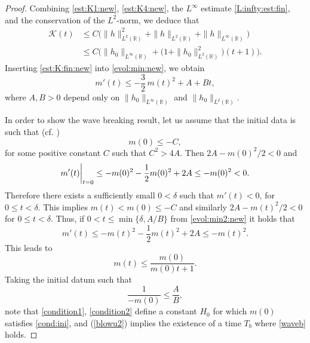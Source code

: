 \documentclass[final,11pt,a4paper,reqno]{amsart}
\newcommand{\RR}{\mathbb R}
\theoremstyle{definition}
\begin{document}
\begin{proof}
Combining \eqref{est:K1:new}, \eqref{est:K4:new}, the \(L^\infty\) estimate \eqref{L:infty:est:fin}, and the conservation of the \(L^2\)-norm, we deduce that
\begin{align}
\mathcal K(t)
&\le
C\Big(\|h\|_{L^2(\RR)}^2+\|h\|_{L^2(\RR)}+\|h\|_{L^\infty(\RR)}\Big) \nonumber\\
&\le
C\Big(\|h_0\|_{L^\infty(\RR)}+\big(1+\|h_0\|_{L^2(\RR)}^2\big)(t+1)\Big).
\label{est:K:fin:new}
\end{align}
Inserting \eqref{est:K:fin:new} into \eqref{evol:min:new}, we obtain
\begin{equation}\label{evol:min2:new}
m'(t)\le -\frac32\,m(t)^2+A+Bt,
\end{equation}
where \(A,B>0\) depend only on \(\|h_0\|_{L^\infty(\RR)}\) and \(\|h_0\|_{L^2(\RR)}\). \medskip




In order to show the wave breaking result, let us assume that the initial data is such that (cf. \cite{LeiRic})
\begin{equation}\label{condition1}
m(0)\leq -C,
\end{equation}
for some positive constant $C$ such that $C^{2}>4A$.
Then $2A-m(0)^{2}/2<0$ and
$$
m'(t)\bigg{|}_{t=0}\leq -m(0)^{2}-\frac{1}{2}m(0)^{2}+ 2A\leq -m(0)^{2}<0.
$$
Therefore there exists a sufficiently small $0<\delta$ such that $m'(t)<0$, for $0\leq t<\delta$.
This implies $m(t)<m(0)\leq -C$  and similarly $2A-m(t)^{2}/2<0$ for $0\leq t<\delta$.
Thus, if 
$0<t\leq \min\{\delta,A/B\}$ 
from \eqref{evol:min2:new} it holds that
$$
m'(t)\leq - m(t)^{2}-\frac{1}{2}m(t)^{2}+ 2A \leq - m(t)^{2}.
$$
This leads to
\begin{equation}\label{blowu2}
m(t)\leq \frac{m(0)}{m(0)t+1}.
\end{equation}
Taking the initial datum such that
\begin{equation}\label{condition2}
\frac{1}{-m(0)}\leq \frac{A}{B},
\end{equation}
note that \eqref{condition1}, \eqref{condition2} define a constant $H_{0}$ for which $m(0)$ satisfies \eqref{cond:ini}, and (\ref{blowu2}) implies the existence of a time $T_{b}$ where \eqref{waveb} holds.
\end{proof}
\end{document}
